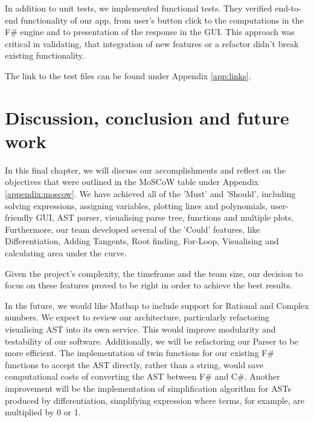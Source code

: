 \documentclass[a4paper, oneside, 11pt]{report}
\begin{document}
In addition to unit tests, we implemented functional tests. They verified end-to-end  functionality of our app, from user's button click to the computations in the F\# engine and to presentation of the response in the GUI. This approach was critical in validating, that integration of new features or a refactor didn't break existing functionality.

The link to the test files can be found under Appendix \ref{app:links}.

\chapter{Discussion, conclusion and future work}


In this final chapter, we will discuss our accomplishments and reflect on the objectives that were outlined in the MoSCoW table under Appendix \ref{appendix:moscow}. We have achieved all of the 'Must' and 'Should', including solving expressions, assigning variables, plotting lines and polynomials, user-friendly GUI, AST parser, visualising parse tree, functions and multiple plots. Furthermore, our team developed several of the 'Could' features, like Differentiation, Adding Tangents, Root finding, For-Loop, Visualising and calculating area under the curve. 

Given the project's complexity, the timeframe and the team size, our decision to focus on these features proved to be right in order to achieve the best results.

In the future, we would like Matbap to include support for Rational and Complex numbers. We expect to review our architecture, particularly refactoring visualising AST into its own service. This would improve modularity and testability of our software. Additionally, we will be refactoring our Parser to be more efficient. The implementation of twin functions for our existing F\# functions to accept the AST directly, rather than a string, would save computational costs of converting the AST between F\# and C\#. Another improvement will be the implementation of simplification algorithm for ASTs produced by differentiation, simplifying expression where terms, for example, are multiplied by 0 or 1.
\end{document}
